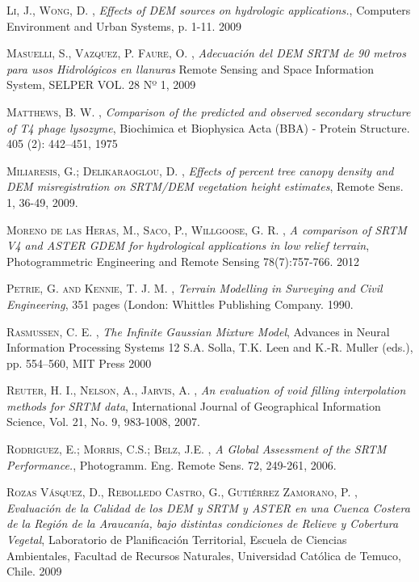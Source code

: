\begin{thebibliography}{9}
 \textsc{Li, J., Wong, D.} , \textit{Effects of DEM sources on hydrologic applications.}, Computers Environment and Urban Systems, p. 1-11. 2009

 \textsc{Masuelli, S., Vazquez, P. Faure, O.} , \textit{Adecuación del DEM SRTM de 90 metros para usos Hidrológicos en llanuras} Remote Sensing and Space Information System, SELPER VOL. 28 Nº 1, 2009 

 \textsc{Matthews, B. W.} , \textit{Comparison of the predicted and observed secondary structure of T4 phage lysozyme}, Biochimica et Biophysica Acta (BBA) - Protein Structure. 405 (2): 442–451, 1975

 \textsc{Miliaresis, G.; Delikaraoglou, D.} , \textit{Effects of percent tree canopy density and DEM misregistration on SRTM/DEM vegetation height estimates},  Remote Sens. 1, 36-49, 2009.

 \textsc{Moreno de las Heras, M., Saco, P., Willgoose, G. R.} , \textit{A comparison of SRTM V4 and ASTER GDEM for hydrological applications in low relief terrain}, Photogrammetric Engineering and Remote Sensing 78(7):757-766. 2012

 \textsc{Petrie, G. and Kennie, T. J. M.} , \textit{Terrain Modelling in Surveying and Civil Engineering},  351 pages (London: Whittles Publishing Company. 1990.

 \textsc{Rasmussen, C. E.} , \textit{The Infinite Gaussian Mixture Model}, Advances in Neural Information Processing Systems 12 S.A. Solla, T.K. Leen and K.-R. Muller (eds.), pp. 554–560, MIT Press 2000

 \textsc{Reuter, H. I., Nelson, A., Jarvis, A.} , \textit{An evaluation of void filling interpolation methods for SRTM data}, International Journal of Geographical Information Science, Vol. 21, No. 9, 983-1008, 2007.

 \textsc{Rodriguez, E.; Morris, C.S.; Belz, J.E.} , \textit{A Global Assessment of the SRTM Performance.},  Photogramm. Eng. Remote Sens. 72, 249-261, 2006.

 \textsc{Rozas Vásquez, D., Rebolledo Castro, G., Gutiérrez Zamorano, P.} , \textit{Evaluación de la Calidad de los DEM y SRTM y ASTER en una Cuenca Costera de la Región de la Araucanía, bajo distintas condiciones de Relieve y Cobertura Vegetal}, Laboratorio de Planificación Territorial, Escuela de Ciencias Ambientales, Facultad de Recursos Naturales, Universidad Católica de Temuco, Chile. 2009


\end{thebibliography}
